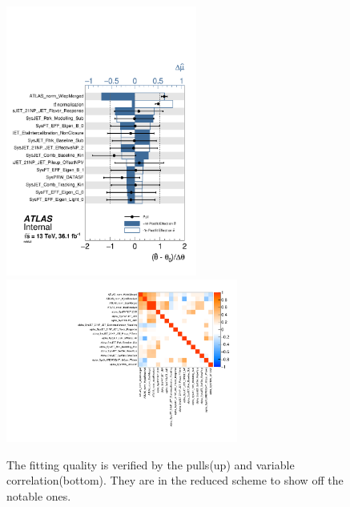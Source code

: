 \begin{figure}[!ht]
	\centering
	\includegraphics[width=0.56\textwidth]{Chapter5/ranking_data_1lepCR.pdf}	
	\includegraphics[width=0.68\textwidth]{Chapter5/corr_data_1lepCR.pdf}	
	\caption{\label{Fig:fit_quality} The fitting quality is verified by the pulls(up) and variable correlation(bottom). They are in the reduced scheme to show off the notable ones.  
	}
\end{figure}

